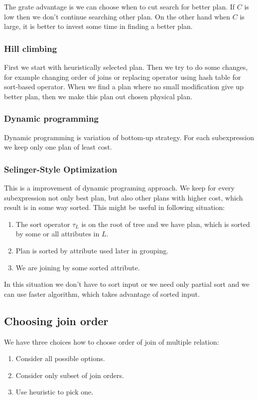 The grate advantage is we can choose when to cut search for better plan. If $C$ is low then we don't continue searching other plan. On the other hand when $C$ is large, it is better to invest some time in finding a  better plan.
\subsubsection{Hill climbing}

First we start with heuristically selected plan. Then we try to do some changes, for example changing order of joins or replacing operator using hash table for sort-based operator. When we find a plan where no small modification give up better plan, then we make this plan out chosen physical plan.

\subsubsection{Dynamic programming}
Dynamic programming is variation of bottom-up strategy. For each subexpression we keep only one plan of least cost.

\subsubsection{Selinger-Style Optimization}
This is a improvement of dynamic programing approach. We keep for every subexpression not only best plan, but also other plans with higher cost, which result is in some way sorted. This might be useful in following situation:
\begin{enumerate}
\item The sort operator $\tau_L$ is on the root of tree and we have plan, which is sorted by some or all attributes in $L$.
\item Plan is sorted by attribute used later in grouping.
\item We are joining by some sorted attribute.
\end{enumerate}
In this situation we don't have to sort input or we need only partial sort and we can use faster algorithm, which takes advantage of sorted input.


\subsection{Choosing join order}
 We have three choices how to choose order of join of multiple relation:
\begin{enumerate}
\item Consider all possible options.
\item Consider only subset of join orders.
\item Use heuristic to pick one.
\end{enumerate}
 
